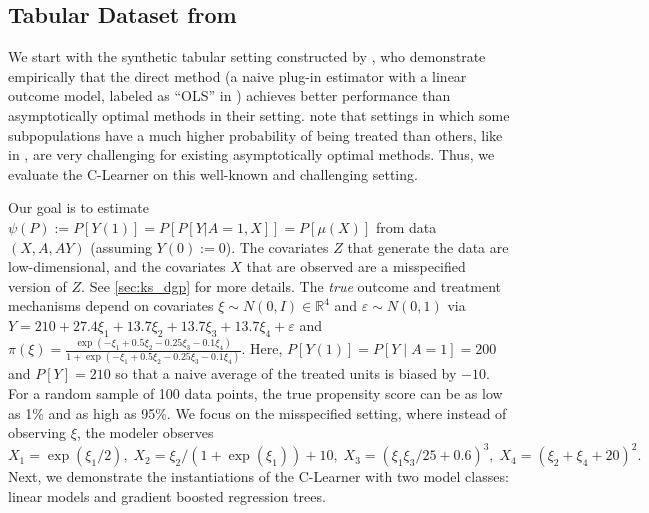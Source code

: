 \subsection{Tabular Dataset from \citet{KangSc07}} 
\label{sec:ks}



We start with the  synthetic tabular setting constructed by \citet{KangSc07}, who
demonstrate empirically that the direct method (a naive plug-in estimator with a linear outcome model, labeled as ``OLS'' in \citep{KangSc07}) achieves better performance than
asymptotically optimal methods in their setting. 
\citet{robins2007comment} note that 
settings in which some subpopulations have a much higher
probability of being treated than others,
like 
in \citet{KangSc07},
are very challenging for existing asymptotically optimal methods. 
Thus, we %
evaluate the C-Learner on this well-known and challenging setting. %

Our goal is to estimate $\psi(P):=P[Y(1)]=P[P[Y| A=1,X]]=P[\mu(X)]$ from data $(X,A,AY)$
(assuming $Y(0) := 0$).
\ifdefined\pnas
The covariates $Z$ that generate the data are low-dimensional, and 
the covariates $X$ that are observed are a misspecified version of $Z$. See \cref{sec:ks_dgp} for more details. 
\else
The \textit{true} outcome and treatment  mechanisms depend on covariates $\xi \sim N(0, I) \in \mathbb R^4$ and $\varepsilon\sim N(0,1)$ via
$Y = 210 + 27.4 \xi_{1} + 13.7 \xi_{2} + 13.7 \xi_{3} + 13.7 \xi_{4} + \varepsilon$ and $ 
\pi(\xi)  = \frac{\exp(-\xi_{1} + 0.5 \xi_{2} - 0.25 \xi_{3} - 0.1 \xi_{4})}{1+\exp(-\xi_{1} + 0.5 \xi_{2} - 0.25 \xi_{3} - 0.1 \xi_{4})}.$
Here, $P[Y(1)]=P[Y\mid A = 1] = 200$ and $P[Y] = 210$ so that a naive average of the treated units is biased by $-10$. For a random sample of 100 data points, the true propensity score can be as low as 1\% and as high as 95\%. We focus on the misspecified setting, where instead of observing $\xi$, the modeler observes
$
X_{1} = \exp(\xi_{1}/2),\;X_{2} = \xi_{2}/(1+\exp(\xi_{1})) + 10,\;X_{3} = (\xi_{1}\xi_{3}/25 + 0.6)^3,\;X_{4} = (\xi_{2} + \xi_{4} + 20)^2.
$
\fi
Next, we demonstrate the instantiations of the C-Learner with two model classes: linear models and gradient boosted regression trees.  



